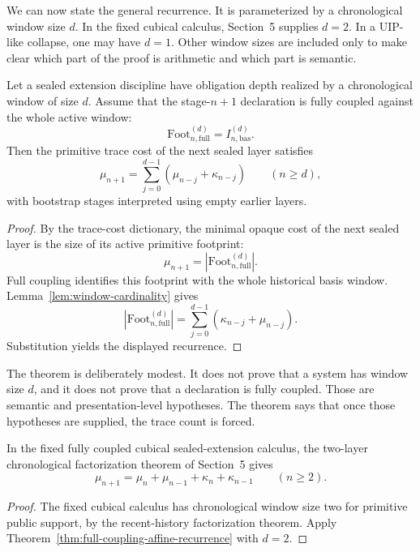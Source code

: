 We can now state the general recurrence.  It is parameterized by a chronological window size
\(d\).  In the fixed cubical calculus, Section~5 supplies \(d=2\).  In a UIP-like collapse,
one may have \(d=1\).  Other window sizes are included only to make clear which part of the
proof is arithmetic and which part is semantic.

\begin{theorem}
\label{thm:full-coupling-affine-recurrence}
Let a sealed extension discipline have obligation depth realized by a chronological window of
size \(d\).  Assume that the stage-\(n+1\) declaration is fully coupled against the whole
active window:
\[
  \mathrm{Foot}^{(d)}_{n,\mathrm{full}} = I^{(d)}_{n,\mathrm{bas}}.
\]
Then the primitive trace cost of the next sealed layer satisfies
\[
  \mu_{n+1}
  =
  \sum_{j=0}^{d-1} (\mu_{n-j}+\kappa_{n-j})
  \qquad (n\geq d),
\]
with bootstrap stages interpreted using empty earlier layers.
\end{theorem}

\begin{proof}
By the trace-cost dictionary, the minimal opaque cost of the next sealed layer is the size of
its active primitive footprint:
\[
  \mu_{n+1}=|\mathrm{Foot}^{(d)}_{n,\mathrm{full}}|.
\]
Full coupling identifies this footprint with the whole historical basis window.  Lemma~\ref{lem:window-cardinality} gives
\[
  |\mathrm{Foot}^{(d)}_{n,\mathrm{full}}|
  =
  \sum_{j=0}^{d-1} (\kappa_{n-j}+\mu_{n-j}).
\]
Substitution yields the displayed recurrence.
\end{proof}

The theorem is deliberately modest.  It does not prove that a system has window size \(d\),
and it does not prove that a declaration is fully coupled.  Those are semantic and
presentation-level hypotheses.  The theorem says that once those hypotheses are supplied, the
trace count is forced.

\begin{corollary}
\label{cor:depth-two-full-coupling-recurrence}
In the fixed fully coupled cubical sealed-extension calculus, the two-layer chronological
factorization theorem of Section~5 gives
\[
  \mu_{n+1}
  =
  \mu_n+\mu_{n-1}+\kappa_n+\kappa_{n-1}
  \qquad (n\geq 2).
\]
\end{corollary}

\begin{proof}
The fixed cubical calculus has chronological window size two for primitive public support, by
the recent-history factorization theorem.  Apply
Theorem~\ref{thm:full-coupling-affine-recurrence} with \(d=2\).
\end{proof}

